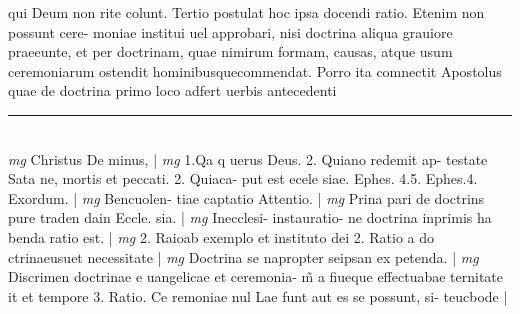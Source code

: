 \documentclass{article}
\begin{document}
\begin{pages}
qui Deum non rite colunt. Tertio postulat hoc ipsa docendi ratio. Etenim non possunt cere- moniae institui uel approbari, nisi doctrina aliqua grauiore praeeunte, et per doctrinam, quae nimirum formam, causas, atque  usum ceremoniarum ostendit hominibusquecommendat. Porro ita comnectit Apostolus quae de doctrina primo loco adfert uerbis antecedenti  \pend
\vspace{0.5cm}\noindent
\vspace{0.2cm}\rule{1cm}{0.2pt}\\ 
\hspace{0.2cm}\textit{mg}
\footnotesize Christus De minus, 
\normalsize| 
\hspace{0.2cm}\textit{mg}
\footnotesize 1.Qa q uerus Deus. 2. Quiano redemit ap- testate Sata ne, mortis et peccati. 2. Quiaca- put est ecele siae. Ephes. 4.5. Ephes.4. Exordum. 
\normalsize| 
\hspace{0.2cm}\textit{mg}
\footnotesize Bencuolen- tiae captatio Attentio. 
\normalsize| 
\hspace{0.2cm}\textit{mg}
\footnotesize Prina pari de doctrins pure traden dain Eccle. sia. 
\normalsize| 
\hspace{0.2cm}\textit{mg}
\footnotesize Inecclesi- instauratio- ne doctrina inprimis ha benda ratio est. 
\normalsize| 
\hspace{0.2cm}\textit{mg}
\footnotesize 2. Raioab exemplo et instituto dei 2. Ratio a do ctrinaeusuet necessitate 
\normalsize| 
\hspace{0.2cm}\textit{mg}
\footnotesize Doctrina se napropter seipsan ex petenda. 
\normalsize| 
\hspace{0.2cm}\textit{mg}
\footnotesize Discrimen doctrinae e uangelicae et ceremonia- m̃ a fiueque  effectuabae ternitate it et tempore 3. Ratio. Ce remoniae nul Lae funt aut es se possunt, si- teucbode 
\normalsize| 

\end{pages}
\end{document}
